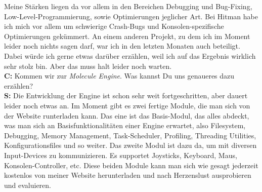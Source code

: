 \documentclass[10pt,a4paper,ngerman,twoside]{article} %
\begin{document}
\begin{multicols}{3}
Meine Stärken liegen da vor allem in den Bereichen Debugging und Bug-Fixing, Low-Level-Programmierung, sowie Optimierungen jeglicher Art. Bei Hitman habe ich mich vor allem um schwierige Crash-Bugs und Konsolen-spezifische Optimierungen gekümmert. An einem anderen Projekt, zu dem ich im Moment leider noch nichts sagen darf, war ich in den letzten Monaten auch beteiligt. Dabei würde ich gerne etwas darüber erzählen, weil ich auf das Ergebnis wirklich sehr stolz bin. Aber das muss halt leider noch warten. \\
\textbf{C:} Kommen wir zur \textit{Molecule Engine}. Was kannst Du uns genaueres dazu erzählen? \\
\textbf{S:} Die Entwicklung der Engine ist schon sehr weit fortgeschritten, aber dauert leider noch etwas an. Im  Moment gibt es zwei fertige Module, die man sich von der Website runterladen kann. Das eine ist das Basis-Modul, das alles abdeckt, was man sich an Basisfunktionalitäten einer Engine erwartet, also Filesystem, Debugging, Memory Management, Task-Scheduler, Profiling, Threading Utilities, Konfigurationsfiles und so weiter. Das zweite Modul ist dazu da, um mit diversen Input-Devices zu kommunizieren. Es supportet Joysticks, Keyboard, Maus, Konsolen-Controller, etc. Diese beiden Module kann man sich wie gesagt jederzeit kostenlos von meiner Website herunterladen und nach Herzenslust ausprobieren und evaluieren.


\end{multicols}
\end{document}
